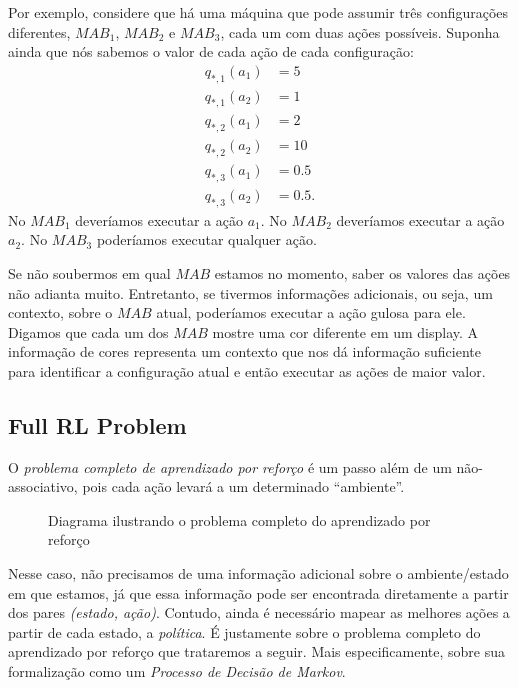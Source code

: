 \documentclass{article}
\begin{document}
            Por exemplo, considere que há uma máquina que pode assumir três configurações diferentes, $MAB_1$, $MAB_2$ e $MAB_3$, cada um com duas ações possíveis. Suponha ainda que nós sabemos o valor de cada ação de cada configuração:
            \begin{equation*}
            \begin{split}
                q_{*,1}(a_1) & = 5\\
                q_{*,1}(a_2) & = 1\\
                q_{*,2}(a_1) & = 2\\
                q_{*,2}(a_2) & = 10\\
                q_{*,3}(a_1) & = 0.5\\
                q_{*,3}(a_2) & = 0.5 .
            \end{split}
            \end{equation*}
            No $MAB_1$ deveríamos executar a ação $a_1$. No $MAB_2$ deveríamos executar a ação $a_2$. No $MAB_3$ poderíamos executar qualquer ação.
            
            Se não soubermos em qual $MAB$ estamos no momento, saber os valores das ações não adianta muito. Entretanto, se tivermos informações adicionais, ou seja, um contexto, sobre o $MAB$ atual, poderíamos executar a ação gulosa para ele. Digamos que cada um dos $MAB$ mostre uma cor diferente em um display. A informação de cores representa um contexto que nos dá informação suficiente para identificar a configuração atual e então executar as ações de maior valor.
            
        \subsection{Full RL Problem}
        
            O \emph{problema completo de aprendizado por reforço} é um passo além de um não-associativo, pois cada ação levará a um determinado ``ambiente''. 
        
            \begin{figure}[ht]
                \centering
                \fullrldiagram
                \caption{Diagrama ilustrando o problema completo do aprendizado por reforço}
                \label{fig:full-rl-problem}
            \end{figure}
            
            Nesse caso, não precisamos de uma informação adicional sobre o ambiente/estado em que estamos, já que essa informação pode ser encontrada diretamente a partir dos pares \emph{(estado, ação)}. Contudo, ainda é necessário mapear as melhores ações a partir de cada estado, a \emph{política}. É justamente sobre o problema completo do aprendizado por reforço que trataremos a seguir. Mais especificamente, sobre sua formalização como um \emph{Processo de Decisão de Markov}.
\end{document}
